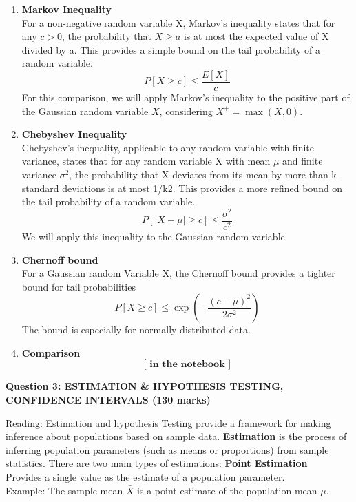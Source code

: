 \documentclass[a3paper,12pt]{extarticle} %
\begin{document}
    \begin{enumerate}
        \item \textbf{ Markov Inequality}
        \\ For a non-negative random variable X, Markov's inequality states that for any \(c > 0\), the probability that \(X \geq a\) is at most the expected value of X divided by a. This provides a simple bound on the tail probability of a random variable.
        \[
        P[X \geq c] \leq \frac{E[X]}{c}
        \]
        For this comparison, we will apply Markov's inequality to the positive part of the Gaussian random variable \(X\), considering \(X^{+} = \max(X, 0)\).
        \item \textbf{ Chebyshev Inequality}
        \\ Chebyshev's inequality, applicable to any random variable with finite variance, states that for any random variable X with mean \(\mu\) and finite variance \(\sigma^2\), the probability that X deviates from its mean by more than k standard deviations is at most 1/k2. This provides a more refined bound on the tail probability of a random variable.
        \[
        P[|X - \mu| \geq c] \leq \frac{\sigma^2}{c^2}
        \]
        We will apply this inequality to the Gaussian random variable
        \item \textbf{ Chernoff bound}
        \\ For a Gaussian random Variable X, the Chernoff bound provides a tighter bound for tail probabilities
        \[
        P[X \geq c] \leq \exp(-\frac{(c-\mu)^2}{2\sigma^2})
        \]
        The bound is especially for normally distributed data.
        \item \textbf{ Comparison}
        \[
        \textbf{[ in the notebook ]}
        \]
    \end{enumerate}
    \newpage
    \begin{center}
        \large \textbf{Question 3: ESTIMATION \& HYPOTHESIS TESTING, CONFIDENCE INTERVALS (130 marks)}
    \end{center}
    Reading: Estimation and hypothesis Testing provide a framework for making inference about populations based on sample data. \textbf{Estimation} is the process of inferring population parameters (such as means or proportions) from sample statistics. There are two main types of estimations:
    \subitem \textbf{Point Estimation} 
    \\ Provides a single value as the estimate of a population parameter. 
    \\ Example: The sample mean \(\bar{X}\) is a point estimate of the population mean \(\mu\).
\end{document}
